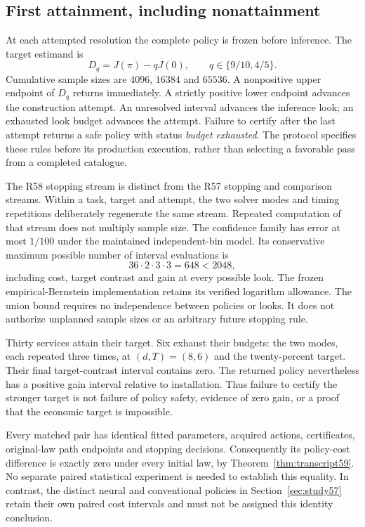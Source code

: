 \subsection{First attainment, including nonattainment}
At each attempted resolution the complete policy is frozen before inference. The target estimand is
\[
 D_q=J(\pi)-qJ(0),\qquad q\in\{9/10,4/5\}.
\]
Cumulative sample sizes are $4096$, $16384$ and $65536$. A nonpositive upper endpoint of $D_q$ returns immediately. A strictly positive lower endpoint advances the construction attempt. An unresolved interval advances the inference look; an exhausted look budget advances the attempt. Failure to certify after the last attempt returns a safe policy with status \emph{budget exhausted}. The protocol specifies these rules before its production execution, rather than selecting a favorable pass from a completed catalogue.

The R58 stopping stream is distinct from the R57 stopping and comparison streams. Within a task, target and attempt, the two solver modes and timing repetitions deliberately regenerate the same stream. Repeated computation of that stream does not multiply sample size. The confidence family has error at most $1/100$ under the maintained independent-bin model. Its conservative maximum possible number of interval evaluations is
\[
 36\cdot2\cdot3\cdot3=648<2048,
\]
including cost, target contrast and gain at every possible look. The frozen empirical-Bernstein implementation retains its verified logarithm allowance. The union bound requires no independence between policies or looks. It does not authorize unplanned sample sizes or an arbitrary future stopping rule.




Thirty services attain their target. Six exhaust their budgets: the two modes, each repeated three times, at $(d,T)=(8,6)$ and the twenty-percent target. Their final target-contrast interval contains zero. The returned policy nevertheless has a positive gain interval relative to installation. Thus failure to certify the stronger target is not failure of policy safety, evidence of zero gain, or a proof that the economic target is impossible.

Every matched pair has identical fitted parameters, acquired actions, certificates, original-law path endpoints and stopping decisions. Consequently its policy-cost difference is exactly zero under every initial law, by Theorem~\ref{thm:transcript59}. No separate paired statistical experiment is needed to establish this equality. In contrast, the distinct neural and conventional policies in Section~\ref{sec:study57} retain their own paired cost intervals and must not be assigned this identity conclusion.

